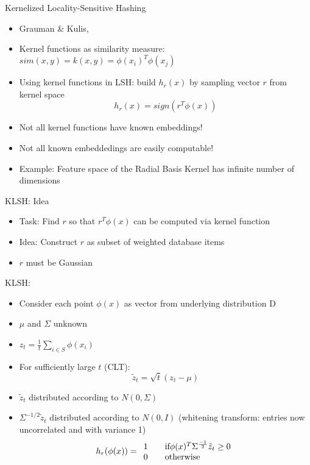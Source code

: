 \documentclass[12pt,a4paper]{beamer}
\begin{document}
\begin{frame}{Kernelized Locality-Sensitive Hashing}
\begin{itemize}
\item Grauman \& Kulis,  \cite{klsh}
\item Kernel functions as similarity measure: $sim(x,y) = k(x,y) = \phi(x_{i})^{T}\phi(x_{j}) $
\item Using kernel functions in LSH: build $h_r(x)$ by sampling vector $r$ from kernel space
$$h_r(x)=sign(r^T\phi(x))$$
\item Not all kernel functions have known embeddings! \cite{klsh}
\item Not all known embeddedings are easily computable!
\item Example: Feature space of the Radial Basis Kernel has infinite number of dimensions
\end{itemize}
\end{frame}

\begin{frame}{KLSH: Idea}
\begin{itemize}
\item Task: Find $r$ so that $r^T\phi (x)$ can be computed via kernel function
\item Idea: Construct $r$ as subset of weighted database items
\item $r$ must be Gaussian \cite{lsh}
\end{itemize}
\end{frame}

\begin{frame}{KLSH: }
\begin{itemize}
\item Consider each point $\phi(x)$ as vector from underlying distribution D
\item $\mu$ and $\Sigma$ unknown
\item $z_{t} = \frac{1}{t}\sum_{i \in S}{\phi (x_{i})}$
\item For sufficiently large $t$ (CLT):
$$ \tilde{z}_{t} = \sqrt{t}(z_{t} - \mu) $$
\item $ \tilde{z}_{t}$ distributed according to  $N(0,\Sigma)$
\item $\Sigma^{-1/2}\tilde{z}_{t}$ distributed according to $N(0,I)$ (whitening transform: entries now uncorrelated and with variance 1)
$$h_r(\phi ( x) )= \begin{array}{l l}
    1 & \quad \text{if} \phi (x)^{T} \Sigma^{\frac{-1}{2}}\tilde{z}_{t} \geq 0\\
    0 & \quad \text{otherwise}
  \end{array}$$
\end{itemize}
\end{frame}
\end{document}
